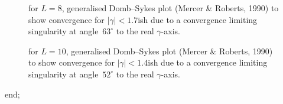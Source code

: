 \documentclass[11pt,a5paper]{article}
\begin{document}
\begin{figure}
\centering
\caption{\label{fig:tiwdbcDS}%
for \(L=8\), generalised Domb--Sykes plot (Mercer \& Roberts, 1990) to show convergence for \(|\gamma|<1.7\)ish due to a convergence limiting singularity at angle~\(63^\circ\) to the real \(\gamma\)-axis.}

\end{figure}




\begin{figure}
\centering
\caption{\label{fig:tiwdbcDS}%
for \(L=10\), generalised Domb--Sykes plot (Mercer \& Roberts, 1990) to show convergence for \(|\gamma|<1.4\)ish due to a convergence limiting singularity at angle~\(52^\circ\) to the real \(\gamma\)-axis.}

\end{figure}




\begin{reduce}
end;
\end{reduce}
\end{document}
